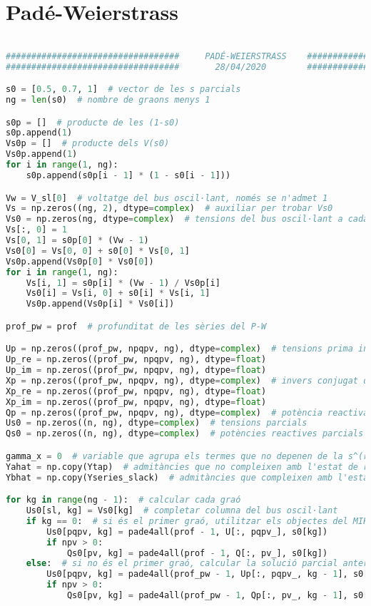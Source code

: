 \section{Padé-Weierstrass}
\begin{lstlisting}[language=Python,numbers=none]

##################################     PADÉ-WEIERSTRASS    ###################################
##################################       28/04/2020        ###################################

s0 = [0.5, 0.7, 1]  # vector de les s parcials
ng = len(s0)  # nombre de graons menys 1

s0p = []  # producte de les (1-s0)
s0p.append(1)
Vs0p = []  # producte dels V(s0)
Vs0p.append(1)
for i in range(1, ng):
    s0p.append(s0p[i - 1] * (1 - s0[i - 1]))

Vw = V_sl[0]  # voltatge del bus oscil·lant, només se n'admet 1
Vs = np.zeros((ng, 2), dtype=complex)  # auxiliar per trobar Vs0
Vs0 = np.zeros(ng, dtype=complex)  # tensions del bus oscil·lant a cada graó
Vs[:, 0] = 1
Vs[0, 1] = s0p[0] * (Vw - 1)
Vs0[0] = Vs[0, 0] + s0[0] * Vs[0, 1]
Vs0p.append(Vs0p[0] * Vs0[0])
for i in range(1, ng):
    Vs[i, 1] = s0p[i] * (Vw - 1) / Vs0p[i]
    Vs0[i] = Vs[i, 0] + s0[i] * Vs[i, 1]
    Vs0p.append(Vs0p[i] * Vs0[i])

prof_pw = prof  # profunditat de les sèries del P-W

Up = np.zeros((prof_pw, npqpv, ng), dtype=complex)  # tensions prima incògnita
Up_re = np.zeros((prof_pw, npqpv, ng), dtype=float)
Up_im = np.zeros((prof_pw, npqpv, ng), dtype=float)
Xp = np.zeros((prof_pw, npqpv, ng), dtype=complex)  # invers conjugat de la tensió prima
Xp_re = np.zeros((prof_pw, npqpv, ng), dtype=float)
Xp_im = np.zeros((prof_pw, npqpv, ng), dtype=float)
Qp = np.zeros((prof_pw, npqpv, ng), dtype=complex)  # potència reactiva prima incògnita
Us0 = np.zeros((n, ng), dtype=complex)  # tensions parcials
Qs0 = np.zeros((n, ng), dtype=complex)  # potències reactives parcials

gamma_x = 0  # variable que agrupa els termes que no depenen de la s^(r)
Yahat = np.copy(Ytap)  # admitàncies que no compleixen amb l'estat de referència
Ybhat = np.copy(Yseries_slack)  # admitàncies que compleixen amb l'estat de referència

for kg in range(ng - 1):  # calcular cada graó
    Us0[sl, kg] = Vs0[kg]  # completar columna del bus oscil·lant
    if kg == 0:  # si és el primer graó, utilitzar els objectes del MIH bàsic
        Us0[pqpv, kg] = pade4all(prof - 1, U[:, pqpv_], s0[kg])
        if npv > 0:
            Qs0[pv, kg] = pade4all(prof - 1, Q[:, pv_], s0[kg])
    else:  # si no és el primer graó, calcular la solució parcial anterior
        Us0[pqpv, kg] = pade4all(prof_pw - 1, Up[:, pqpv_, kg - 1], s0[kg])
        if npv > 0:
            Qs0[pv, kg] = pade4all(prof_pw - 1, Qp[:, pv_, kg - 1], s0[kg])


\end{lstlisting}
